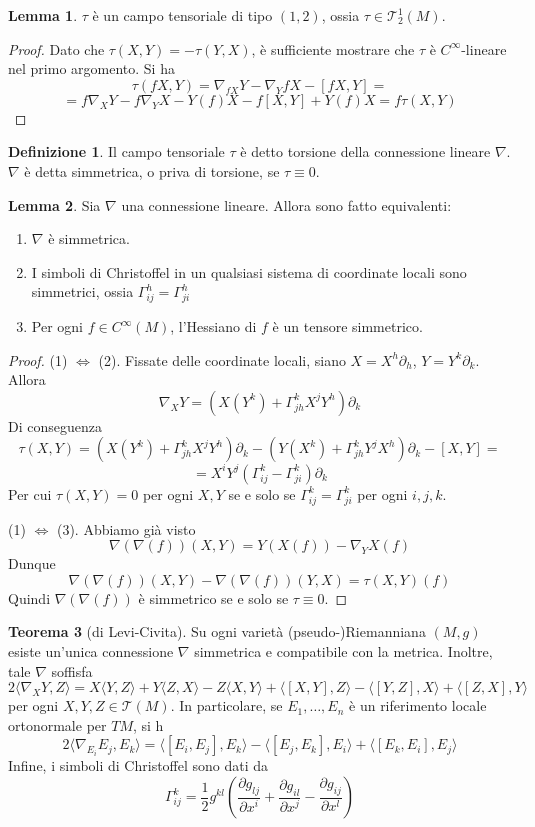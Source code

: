 \documentclass[a4paper,11pt]{article}
\theoremstyle{definition}
\newtheorem{definizione}{Definizione}[section]
\theoremstyle{theorem}
\newtheorem{teorema}{Teorema}[section]
\newtheorem{lemma}[teorema]{Lemma}
\newcommand{\T}{\mathcal{T}}
\begin{document}
\begin{lemma}
	$\tau$ è un campo tensoriale di tipo $(1,2)$, ossia $\tau\in\T^1_2(M)$.
\end{lemma}
\begin{proof}
	Dato che $\tau(X,Y)=-\tau(Y,X)$, è sufficiente mostrare che $\tau$ è $C^\infty$-lineare nel primo argomento. Si ha
	\[\tau(fX,Y)=\nabla_{fX}Y-\nabla_YfX-[fX,Y]=\]\[=f\nabla_XY-f\nabla_YX-Y(f)X-f[X,Y]+Y(f)X=f\tau(X,Y)\]
\end{proof}
\begin{definizione}
	Il campo tensoriale $\tau$ è detto torsione della connessione lineare $\nabla$. $\nabla$ è detta simmetrica, o priva di torsione, se $\tau\equiv0$.
\end{definizione}
\begin{lemma}
	Sia $\nabla$ una connessione lineare. Allora sono fatto equivalenti:
	\begin{enumerate}
		\item $\nabla$ è simmetrica.
		\item I simboli di Christoffel in un qualsiasi sistema di coordinate locali sono simmetrici, ossia $\Gamma^h_{ij}=\Gamma^h_{ji}$
		\item Per ogni $f\in C^\infty(M)$, l'Hessiano di $f$ è un tensore simmetrico.	
	\end{enumerate}
\end{lemma}
\begin{proof}
	(1) $\Leftrightarrow$ (2). Fissate delle coordinate locali, siano $X=X^h\partial_h$, $Y=Y^k\partial_k$. Allora
	\[\nabla_XY=\left(X(Y^k)+\Gamma^k_{jh}X^jY^h\right)\partial_k\]
	Di conseguenza
	\[\tau(X,Y)=\left(X(Y^k)+\Gamma^k_{jh}X^jY^h\right)\partial_k-\left(Y(X^k)+\Gamma^k_{jh}Y^jX^h\right)\partial_k-[X,Y]=\]\[=X^iY^j\left(\Gamma^k_{ij}-\Gamma^k_{ji}\right)\partial_k\]
	Per cui $\tau(X,Y)=0$ per ogni $X,Y$ se e solo se $\Gamma^k_{ij}=\Gamma^k_{ji}$ per ogni $i,j,k$.
	
	\noindent (1) $\Leftrightarrow$ (3). Abbiamo già visto
	\[\nabla\left(\nabla(f)\right)(X,Y)=Y(X(f))-\nabla_YX(f)\]
	Dunque
	\[\nabla\left(\nabla(f)\right)(X,Y)-\nabla\left(\nabla(f)\right)(Y,X)=\tau(X,Y)(f)\]
	Quindi $\nabla\left(\nabla(f)\right)$ è simmetrico se e solo se $\tau\equiv0$.	
\end{proof}
\begin{teorema}[di Levi-Civita]
	Su ogni varietà (pseudo-)Riemanniana $(M,g)$ esiste un'unica connessione $\nabla$ simmetrica e compatibile con la metrica. Inoltre, tale $\nabla$ soffisfa
	\[2\langle\nabla_XY,Z\rangle=X\langle Y,Z\rangle+Y\langle Z,X\rangle-Z\langle X,Y\rangle+\langle[X,Y],Z\rangle-\langle[Y,Z],X\rangle+\langle[Z,X],Y\rangle\]
	per ogni $X,Y,Z\in\T(M)$. In particolare, se $E_1,\dots,E_n$ è un riferimento locale ortonormale per $TM$, si h
	\[2\langle\nabla_{E_i}E_j,E_k\rangle=\langle[E_i,E_j],E_k\rangle-\langle[E_j,E_k],E_i\rangle+\langle[E_k,E_i],E_j\rangle\]
	Infine, i simboli di Christoffel sono dati da
	\[\Gamma^{k}_{ij}=\frac{1}{2}g^{kl}\left(\frac{\partial g_{lj}}{\partial x^i}+\frac{\partial g_{il}}{\partial x^j}-\frac{\partial g_{ij}}{\partial x^l}\right)\]
\end{teorema}
\end{document}
